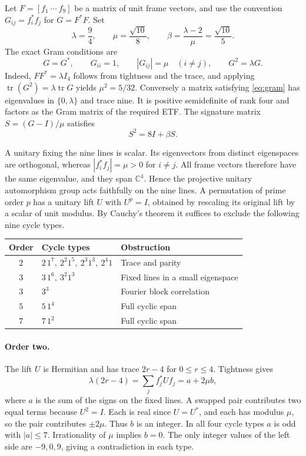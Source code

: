 \documentclass[11pt]{article}
\newcommand{\C}{\mathbb C}
\newcommand{\tr}{\operatorname{tr}}
\begin{document}
Let $F=[f_1\ \cdots\ f_9]$ be a matrix of unit frame vectors, and use the convention $G_{ij}=f_i^*f_j$ for $G=F^*F$. Set
\[
 \lambda=\frac94,\qquad \mu=\frac{\sqrt{10}}8,\qquad
 \beta=\frac{\lambda-2}{\mu}=\frac{\sqrt{10}}5.
\]
The exact Gram conditions are
\begin{equation}\label{eq:gram}
 G=G^*,\qquad G_{ii}=1,\qquad |G_{ij}|=\mu\quad(i\ne j),\qquad G^2=\lambda G.
\end{equation}
Indeed, $FF^*=\lambda I_4$ follows from tightness and the trace, and applying $\tr(G^2)=\lambda\tr G$ yields $\mu^2=5/32$. Conversely a matrix satisfying \eqref{eq:gram} has eigenvalues in $\{0,\lambda\}$ and trace nine. It is positive semidefinite of rank four and factors as the Gram matrix of the required ETF. The signature matrix $S=(G-I)/\mu$ satisfies
\begin{equation}\label{eq:signature}
 S^2=8I+\beta S.
\end{equation}

A unitary fixing the nine lines is scalar. Its eigenvectors from distinct eigenspaces are orthogonal, whereas $|f_i^*f_j|=\mu>0$ for $i\ne j$. All frame vectors therefore have the same eigenvalue, and they span $\C^4$. Hence the projective unitary automorphism group acts faithfully on the nine lines. A permutation of prime order $p$ has a unitary lift $U$ with $U^p=I$, obtained by rescaling its original lift by a scalar of unit modulus. By Cauchy's theorem it suffices to exclude the following nine cycle types.
\begin{center}
\begin{tabular}{@{}cll@{}}
\toprule
Order & Cycle types & Obstruction\\
\midrule
$2$ & $2\,1^7,\ 2^2 1^5,\ 2^3 1^3,\ 2^4 1$ & Trace and parity\\
$3$ & $3\,1^6,\ 3^2 1^3$ & Fixed lines in a small eigenspace\\
$3$ & $3^3$ & Fourier block correlation\\
$5$ & $5\,1^4$ & Full cyclic span\\
$7$ & $7\,1^2$ & Full cyclic span\\
\bottomrule
\end{tabular}
\end{center}

\paragraph{Order two.}
The lift $U$ is Hermitian and has trace $2r-4$ for $0\le r\le4$. Tightness gives
\[
 \lambda(2r-4)=\sum_j f_j^*Uf_j=a+2\mu b,
\]
where $a$ is the sum of the signs on the fixed lines. A swapped pair contributes two equal terms because $U^2=I$. Each is real since $U=U^*$, and each has modulus $\mu$, so the pair contributes $\pm2\mu$. Thus $b$ is an integer. In all four cycle types $a$ is odd with $|a|\le7$. Irrationality of $\mu$ implies $b=0$. The only integer values of the left side are $-9,0,9$, giving a contradiction in each type.
\end{document}

